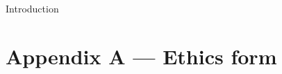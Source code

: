 \documentclass[oneside]{article}
\begin{document}

	\tableofcontents
	\clearpage
	\listoffigures
	\clearpage
{}

		{Introduction}
	\clearpage

		\section{Appendix A --- Ethics form}
		
	
	
\end{document}
